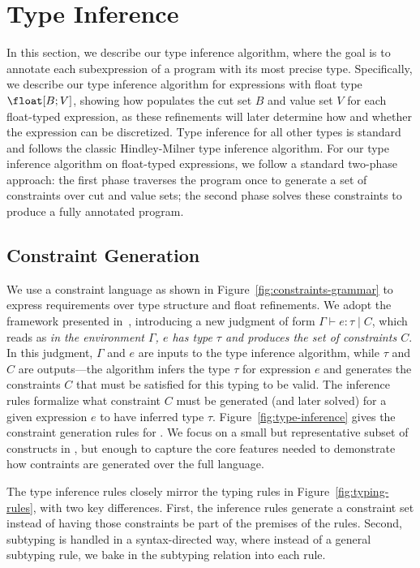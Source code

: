 \section{Type Inference}\label{sec:type-inference-new}

In this section, we describe our type inference algorithm, where the goal is to annotate each subexpression of a program with its most precise type. Specifically, we describe our type inference algorithm for expressions with float type $\float[B;V]$, showing how \Slice{} populates the cut set $B$ and value set $V$ for each float-typed expression, as these refinements will later determine how and whether the expression can be discretized. Type inference for all other types is standard and follows the classic Hindley-Milner type inference algorithm. For our type inference algorithm on float-typed expressions, we follow a standard two-phase approach: the first phase traverses the program once to generate a set of constraints over cut and value sets; the second phase solves these constraints to produce a fully annotated program.

\subsection{Constraint Generation}

We use a constraint language as shown in Figure~\ref{fig:constraints-grammar} to express requirements over type structure and float refinements. We adopt the framework presented in~\cite{Odersky1999ConstrainedTypes}, introducing a new judgment of form $\Gamma \vdash e : \tau \mid C$, which reads as \emph{in the environment $\Gamma$, $e$ has type $\tau$ and produces the set of constraints $C$}. In this judgment, $\Gamma$ and $e$ are inputs to the type inference algorithm, while $\tau$ and $C$ are outputs—the algorithm infers the type $\tau$ for expression $e$ and generates the constraints $C$ that must be satisfied for this typing to be valid. The inference rules formalize what constraint $C$ must be generated (and later solved) for a given expression $e$ to have inferred type $\tau$. Figure~\ref{fig:type-inference} gives the constraint generation rules for \Slice{}. We focus on a small but representative subset of constructs in \Slice{}, but enough to capture the core features needed to demonstrate how contraints are generated over the full language.

The type inference rules closely mirror the typing rules in Figure~\ref{fig:typing-rules}, with two key differences. First, the inference rules generate a constraint set instead of having those constraints be part of the premises of the rules. Second, subtyping is handled in a syntax-directed way, where instead of a general subtyping rule, we bake in the subtyping relation into each rule.

